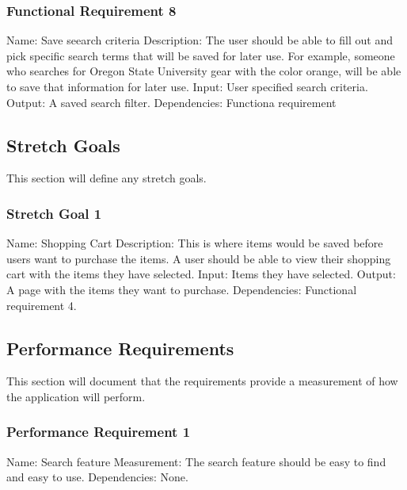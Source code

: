 \documentclass[journal,compsoc, 10pt, draftclsnofoot, onecolumn]{IEEEtran}
\begin{document}
\subsubsection{Functional Requirement 8}
Name: Save seearch criteria
Description: The user should be able to fill out and pick specific search terms
that will be saved for later use. For example, someone who searches for Oregon 
State University gear with the color orange, will be able to save that information
for later use.\newline
Input: User specified search criteria.\newline
Output: A saved search filter.\newline
Dependencies: Functiona requirement 

\subsection{Stretch Goals}

This section will define any stretch goals.

\subsubsection{Stretch Goal 1}
Name: Shopping Cart\newline
Description: This is where items would be saved before users want to
purchase the items. A user should be able to view their shopping cart with
the items they have selected.\newline
Input: Items they have selected.\newline
Output: A page with the items they want to purchase.\newline
Dependencies: Functional requirement 4.

\subsection{Performance Requirements}

This section will document that the requirements provide a measurement of how 
the application will perform.

\subsubsection{Performance Requirement 1}
Name: Search feature\newline
Measurement: The search feature should be easy to find and easy to use.\newline
Dependencies: None.
\end{document}
